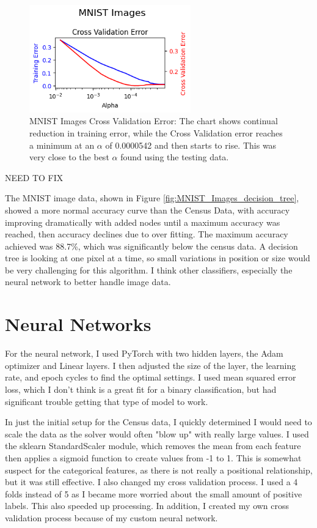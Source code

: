 \documentclass[letterpaper]{article} %
\begin{document}
\begin{figure}[htb]
\centering
\includegraphics[width=2.75in]{figures/MNIST_Images_decision_tree_cross_validation.png}
\caption{MNIST Images Cross Validation Error:  The chart shows continual reduction in training error, while the Cross Validation error reaches a minimum at an $\alpha$ of 0.0000542 and then starts to rise.  This was very close to the best $\alpha$ found using the testing data. }
\label{fig:MNIST_Images_decision_tree_cross_validation}
\end{figure}

NEED TO FIX

The MNIST image data, shown in Figure \ref{fig:MNIST_Images_decision_tree}, showed a more normal accuracy curve than the Census Data, with accuracy improving dramatically with added nodes until a maximum accuracy was reached, then accuracy declines due to over fitting.  The maximum accuracy achieved was 88.7\%, which was significantly below the census data.  A decision tree is looking at one pixel at a time, 
so small variations in position or size would be very challenging for this algorithm.  I think other classifiers, especially the neural network to better handle image data. 

\section{Neural Networks}
For the neural network, I used PyTorch with two hidden layers, the Adam optimizer and Linear layers.  I then adjusted the size of the layer, the learning rate, and epoch cycles to find the optimal settings.  I used mean squared error loss, which I don't think is a great fit for a binary classification, but had significant trouble getting that type of model to work.  

In just the initial setup for the Census data, I quickly determined I would need to scale the data as the solver would often "blow up" with really large values.  I used the sklearn StandardScaler module, which removes the mean from each feature then applies a sigmoid function to create values from -1 to 1.  This is somewhat suspect for the categorical features, as there is not really a positional relationship, but it was still effective.  I also changed my cross validation process.  I used a 4 folds instead of 5 as I became more worried about the small amount of positive labels.  This also speeded up processing.  In addition, I created my own cross validation process because of my custom neural network. 
\end{document}
